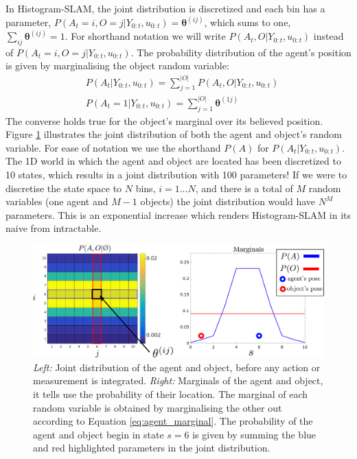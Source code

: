In Histogram-SLAM, the joint distribution is discretized and each bin has a parameter, 
$P(A_t=i,O=j|Y_{0:t},u_{0:t}) = \boldsymbol{\theta}^{(ij)}$, which sums to one, $\sum_{ij} \boldsymbol{\theta}^{(ij)} = 1$. 
For shorthand notation we will write $P(A_t,O|Y_{0:t},u_{0:t})$ instead of $P(A_t=i,O=j|Y_{0:t},u_{0:t})$.
The probability distribution of the agent's position is given by marginalising the object random variable:
\begin{align}
 &P(A_t|Y_{0:t},u_{0:t})    = \sum\limits_{j=1}^{|O|} P(A_t,O|Y_{0:t},u_{0:t}) \label{eq:agent_marginal} \\
 &P(A_t=1|Y_{0:t},u_{0:t})  = \sum\limits_{j=1}^{|O|} \boldsymbol{\theta}^{(1j)}
\end{align}
The converse holds true for the object's marginal over its believed position. Figure \ref{fig:histogram_joint} illustrates 
the joint distribution of both the agent and object's random variable. For ease of notation we use the shorthand $P(A)$
for $P(A_t|Y_{0:t},u_{0:t})$. The 1D world in which the agent and object are located has been discretized to 10 states,
which results in a joint distribution with 100 parameters!
If we were to discretise the state space to $N$ bins, $i=1...N$, and there is a total of $M$ random variables (one agent and $M-1$ objects)
the joint distribution would have $N^{M}$ parameters. This is an exponential increase which renders Histogram-SLAM in its naive from 
intractable.

\begin{figure}
 \centering
 \includegraphics[width=\textwidth]{./ch5-MLMF/Figures/explenation/hist_SLAM.pdf}
 \caption{\textit{Left:} Joint distribution of the agent and object, before any action or measurement is integrated. 
 \textit{Right:} Marginals of the agent and object, it tells use the probability of their location. The marginal of each 
 random variable is obtained by marginalising the other out according to Equation \ref{eq:agent_marginal}. The probability of
 the agent and object begin in state $s=6$ is given by summing the blue and red highlighted parameters in the joint distribution. }
 \label{fig:histogram_joint}
\end{figure}

